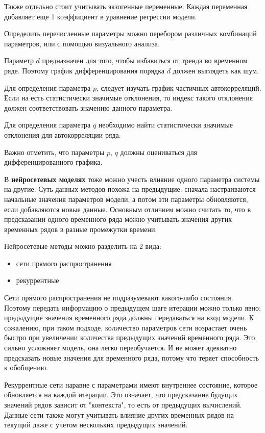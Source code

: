 Также отдельно стоит учитывать экзогенные переменные. Каждая переменная добавляет еще 1 коэффициент
в уравнение регрессии модели.

Определить перечисленные параметры можно перебором различных комбинаций параметров,
или с помощью визуального анализа.

Параметр $ d $ предназначен для того, чтобы избавиться от тренда во временном
ряде. Поэтому график дифференцирования порядка $ d $ должен выглядеть как шум.

Для определения параметра $ p $, следует изучать график частичных автокорреляций.
Если на есть статистически значимые отклонения, то индекс такого отклонения должен соответствовать
значению данного параметра.

Для определения параметра $ q $ необходимо найти статистически значимые отклонения
для автокорреляции ряда.

Важно отметить, что параметры $ p $, $ q $ должны оцениваться для дифференцированного графика.

В \textbf{нейросетевых моделях} тоже можно учесть влияние одного параметра системы на другие.
Суть данных методов похожа на предыдущие: сначала настраиваются начальные
значения параметров модели, а потом эти параметры обновляются, если добавляются новые данные.
Основным отличием можно считать то, что в предсказании одного временного ряда можно
учитывать значения других временных рядов в разные промежутки времени.

Нейросетевые методы можно разделить на 2 вида:
\begin{itemize}
	\item сети прямого распространения
	\item рекуррентные
\end{itemize}

Сети прямого распространения не подразумевают какого-либо состояния.
Поэтому передать информацию о предыдущем шаге итерации можно только явно:
предыдущие значения временного ряда должны передаваться на вход модели.
К сожалению, при таком подходе, количество параметров сети возрастает очень быстро
при увеличении количества предыдущих значений временного ряда. Это сильно усложняет модель,
она легко переобучается. И не может адекватно предсказать новые значения для временного ряда,
потому что теряет способность к обобщению.

Рекуррентные сети наравне с параметрами имеют внутреннее состояние, которое обновляется на каждой
итерации. Это означает, что предсказание будущих значений рядов зависит от "контекста",
то есть от предыдущих вычислений. Данные сети также могут учитывать влияние других
временных рядов на текущий даже с учетом нескольких предыдущих значений.

